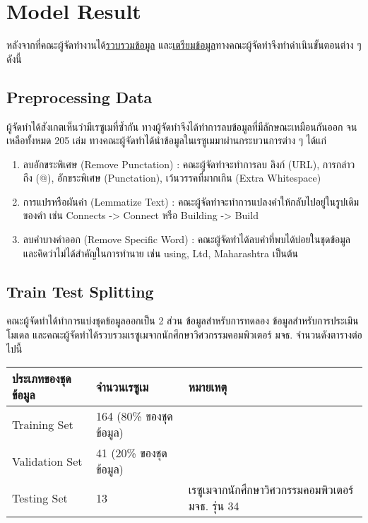 \section{Model Result}
หลังจากที่คณะผู้จัดทำงานได้\hyperref[subsec:Data Collecting]{รวบรวมข้อมูล} และ\hyperref[subsec:Data Preparation]{เตรียมข้อมูล}ทางคณะผู้จัดทำจึงทำดำเนินขั้นตอนต่าง ๆ ดังนี้
\subsection{Preprocessing Data}
ผู้จัดทำได้สังเกตเห็นว่ามีเรซูเมที่ซ้ำกัน ทางผู้จัดทำจึงได้ทำการลบข้อมูลที่มีลักษณะเหมือนกันออก จนเหลือทั้งหมด 205 เล่ม
ทางคณะผู้จัดทำได้นำข้อมูลในเรซูเมมาผ่านกระบวนการต่าง ๆ ได้แก่
\begin{enumerate}
    \item ลบอักขระพิเศษ (Remove Punctation) : คณะผู้จัดทำจะทำการลบ ลิงก์ (URL), การกล่าวถึง (@), อักขระพิเศษ (Punctation), เว้นวรรคที่มากเกิน (Extra Whitespace)
    \item การแปรหรือผันคำ (Lemmatize Text) : คณะผู้จัดทำจะทำการแปลงคำให้กลับไปอยู่ในรูปเดิมของคำ เช่น Connects -> Connect หรือ Building -> Build
    \item ลบคำบางคำออก (Remove Specific Word) : คณะผู้จัดทำได้ลบคำที่พบได้บ่อยในชุดข้อมูล และคิดว่าไม่ได้สำคัญในการทำนาย เช่น using, Ltd, Maharashtra เป็นต้น
\end{enumerate}
\subsection{Train Test Splitting}
คณะผู้จัดทำได้ทำการแบ่งชุดข้อมูลออกเป็น 2 ส่วน ข้อมูลสำหรับการทดลอง ข้อมูลสำหรับการประเมินโมเดล
และคณะผู้จัดทำได้รวบรวมเรซูเมจากนักศึกษาวิศวกรรมคอมพิวเตอร์ มจธ. จำนวนดังตารางต่อไปนี้
\begin{table}[H]
    \begin{tabularx}{\textwidth}{|X|X|l|} \hline
        ประเภทของชุดข้อมูล & จำนวนเรซูเม            & หมายเหตุ                                   \\ \hline
        Training Set    & 164 (80\% ของชุดข้อมูล) &                                           \\ \hline
        Validation Set  & 41 (20\% ของชุดข้อมูล)  &                                           \\ \hline
        Testing Set     & 13                   & เรซูเมจากนักศึกษาวิศวกรรมคอมพิวเตอร์ มจธ. รุ่น 34 \\ \hline
    \end{tabularx}
\end{table}
